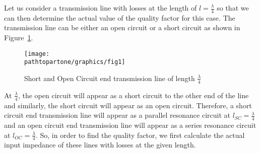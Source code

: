 


Let us consider a transmission line with losses at the length of $ l=\frac{\lambda}{4}$ so that we can then determine the actual value of the quality factor for this case. The transmission line can be either an open circuit or a short circuit as shown in Figure~\ref{fig:fig1}.
\begin{figure}[h]
\centering
\texttt{[image: \\pathtopartone/graphics/fig1]}
\caption{Short and Open Circuit end transmission line of length $\frac{\lambda}{4}$}
\label{fig:fig1}
\end{figure}

At $ \frac{\lambda}{4} $, the open circuit will appear as a short circuit to the other end of the line and similarly, the short circuit will appear as an open circuit. Therefore, a short circuit end transmission line will appear as a parallel resonance circuit at $ l_{SC}=\frac{\lambda}{4} $ and an open circuit end transmission line will appear as a series resonance circuit at $ l_{OC}=\frac{\lambda}{4} $. So, in order to find the quality factor, we first calculate the actual input impedance of these lines with losses at the given length.

